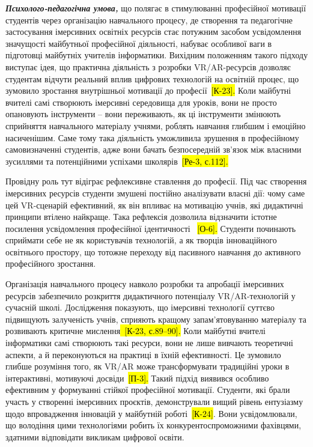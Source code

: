 \emph{\textbf{Психолого-педагогічна умова,}} що полягає в стимулюванні професійної мотивації студентів через організацію навчального процесу, де створення та педагогічне застосування імерсивних освітніх ресурсів стає потужним засобом усвідомлення значущості майбутньої професійної діяльності, набуває особливої ваги в підготовці майбутніх учителів інформатики. Вихідним положенням такого підходу виступає ідея, що практична діяльність з розробки VR/AR-ресурсів дозволяє студентам відчути реальний вплив цифрових технологій на освітній процес, що зумовило зростання внутрішньої мотивації до професії~\hl{{[}К-23{]}.} Коли майбутні вчителі самі створюють імерсивні середовища для уроків, вони не просто опановують інструменти -- вони переживають, як ці інструменти змінюють сприйняття навчального матеріалу учнями, роблять навчання глибшим і емоційно насиченішим. Саме тому така діяльність уможливила зрушення в професійному самовизначенні студентів, адже вони бачать безпосередній зв'язок між власними зусиллями та потенційними успіхами школярів~\hl{{[}Ре-3, с.112{]}.}

Провідну роль тут відіграє рефлексивне ставлення до професії. Під час створення імерсивних ресурсів студенти змушені постійно аналізувати власні дії: чому саме цей VR-сценарій ефективний, як він впливає на мотивацію учнів, які дидактичні принципи втілено найкраще. Така рефлексія дозволила відзначити істотне посилення усвідомлення професійної ідентичності \hl{}~\hl{{[}О-6{]}.} Студенти починають сприймати себе не як користувачів технологій, а як творців інноваційного освітнього простору, що тотожне переходу від пасивного навчання до активного професійного зростання.

Організація навчального процесу навколо розробки та апробації імерсивних ресурсів забезпечило розкриття дидактичного потенціалу VR/AR-технологій у сучасній школі. Дослідження показують, що імерсивні технології суттєво підвищують залученість учнів, сприяють кращому запам'ятовуванню матеріалу та розвивають критичне мислення\hl{~{[}К-23, с.89--90{]}.} Коли майбутні вчителі інформатики самі створюють такі ресурси, вони не лише вивчають теоретичні аспекти, а й переконуються на практиці в їхній ефективності. Це зумовило глибше розуміння того, як VR/AR може трансформувати традиційні уроки в інтерактивні, мотивуючі досвіди~\hl{{[}П-3{]}.} Такий підхід виявився особливо ефективним у формуванні стійкої професійної мотивації. Студенти, які брали участь у створенні імерсивних проєктів, демонстрували вищий рівень ентузіазму щодо впровадження інновацій у майбутній роботі~\hl{{[}К-24{]}}. Вони усвідомлювали, що володіння цими технологіями робить їх конкурентоспроможними фахівцями, здатними відповідати викликам цифрової освіти.

